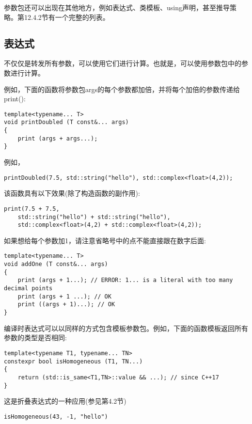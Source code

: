 
参数包还可以出现在其他地方，例如表达式、类模板、using声明，甚至推导策略。第12.4.2节有一个完整的列表。

\subsection{表达式}

不仅仅是转发所有参数，可以使用它们进行计算。也就是，可以使用参数包中的参数进行计算。

例如，下面的函数将参数包args的每个参数都加倍，并将每个加倍的参数传递给print():

\begin{lstlisting}[style=styleCXX]
template<typename... T>
void printDoubled (T const&... args)
{
	print (args + args...);
}
\end{lstlisting}

例如，

\begin{lstlisting}[style=styleCXX]
printDoubled(7.5, std::string("hello"), std::complex<float>(4,2));
\end{lstlisting}

该函数具有以下效果(除了构造函数的副作用):

\begin{lstlisting}[style=styleCXX]
print(7.5 + 7.5,
	std::string("hello") + std::string("hello"),
	std::complex<float>(4,2) + std::complex<float>(4,2));
\end{lstlisting}

如果想给每个参数加1，请注意省略号中的点不能直接跟在数字后面:

\begin{lstlisting}[style=styleCXX]
template<typename... T>
void addOne (T const&... args)
{
	print (args + 1...); // ERROR: 1... is a literal with too many decimal points
	print (args + 1 ...); // OK
	print ((args + 1)...); // OK
}
\end{lstlisting}

编译时表达式可以以同样的方式包含模板参数包。例如，下面的函数模板返回所有参数的类型是否相同:

\begin{lstlisting}[style=styleCXX]
template<typename T1, typename... TN>
constexpr bool isHomogeneous (T1, TN...)
{
	return (std::is_same<T1,TN>::value && ...); // since C++17
}
\end{lstlisting}

这是折叠表达式的一种应用(参见第4.2节)

\begin{lstlisting}[style=styleCXX]
isHomogeneous(43, -1, "hello")
\end{lstlisting}

